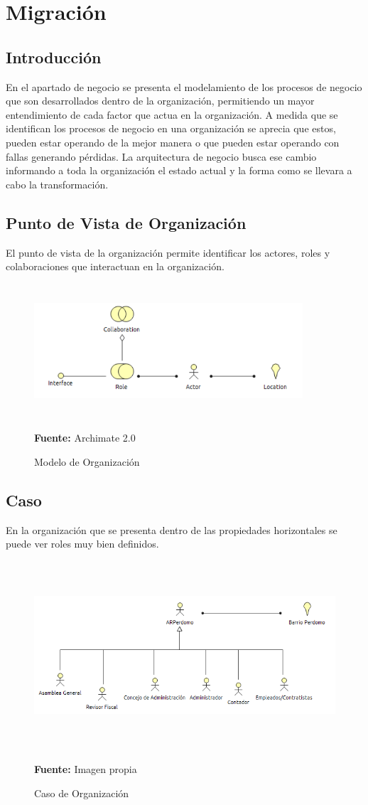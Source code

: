 \section{Migración}
\subsection{Introducción}

En el apartado de negocio se presenta el modelamiento de los procesos de negocio que son desarrollados dentro de la organización, permitiendo un mayor entendimiento de cada factor que actua en la organización. A medida que se identifican los procesos de negocio en una organización se aprecia que estos, pueden estar operando de la mejor manera o que pueden estar operando con fallas generando pérdidas. La arquitectura de negocio busca ese cambio informando a toda la organización el estado actual y la forma como se llevara a cabo la transformación.


\newpage

\subsection{Punto de Vista de Organización}

El punto de vista de la organización permite identificar los actores, roles y colaboraciones que interactuan en la organización.


\begin{figure}[th!]
	\centering
	\includegraphics[width=10cm,height=5cm]{arquitectura/negocio/imgs/m_organizacion}
	\caption{Modelo de Organización}{\scriptsize \textbf{Fuente:} Archimate 2.0}
\end{figure}

\subsection{Caso}

En la organización que se presenta dentro de las propiedades horizontales se puede ver roles muy bien definidos.

\begin{figure}[th!]
	\centering
	\includegraphics[width=12cm,height=7cm]{arquitectura/negocio/imgs/organizacion}
	\caption{Caso de Organización}{\scriptsize \textbf{Fuente:} Imagen propia}
\end{figure}
\newpage